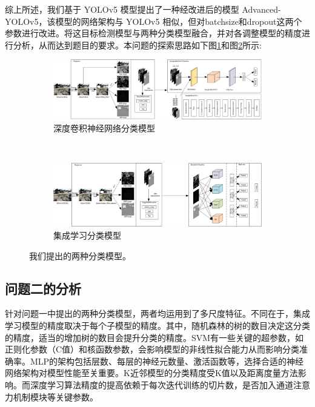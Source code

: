 \documentclass[a4paper, 10pt]{article}
\begin{document}
	综上所述，我们基于 YOLOv5 模型提出了一种经改进后的模型 Advanced-YOLOv5，该模型的网络架构与 YOLOv5 相似，但对batchsize和dropout这两个参数进行改进。将这目标检测模型与两种分类模型融合，并对各调整模型的精度进行分析，从而达到题目的要求。本问题的探索思路如下图\ref{fig: proposed method1}和图\ref{fig: proposed method2}所示:
	
	\begin{figure}[htb] 
		\centering 
		
		\begin{subfigure}{\textwidth}
			\includegraphics[width=\linewidth]{picture/proposed method1}
			\caption{深度卷积神经网络分类模型}
			\label{fig: proposed method1}	
		\end{subfigure} \\
		\begin{subfigure}{\textwidth}
			\includegraphics[width=\linewidth]{picture/proposed method2}
			\caption{集成学习分类模型}
			\label{fig: proposed method2}
		\end{subfigure}	
		\caption{
			\label{fig: Our proposed method}
			我们提出的两种分类模型。
		}
	\end{figure}
	
	
	\subsection{问题二的分析}
	
	针对问题一中提出的两种分类模型，两者均运用到了多尺度特征。不同在于，集成学习模型的精度取决于每个子模型的精度。其中，随机森林的树的数目决定这分类的精度，适当的增加树的数目会提升分类的精度。SVM有一些关键的超参数，如正则化参数（C值）和核函数参数，会影响模型的非线性拟合能力从而影响分类准确率。MLP的架构包括层数、每层的神经元数量、激活函数等，选择合适的神经网络架构对模型性能至关重要。K近邻模型的分类精度受K值以及距离度量方法影响。而深度学习算法精度的提高依赖于每次迭代训练的切片数，是否加入通道注意力机制模块等关键参数。	
	
\end{document}
